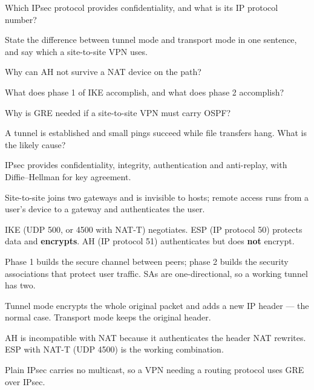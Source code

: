 \begin{checkpoint}
\begin{tightnum}
  \item Which IPsec protocol provides confidentiality, and what is its IP
        protocol number?
  \item State the difference between tunnel mode and transport mode in one
        sentence, and say which a site-to-site VPN uses.
  \item Why can AH not survive a NAT device on the path?
  \item What does phase 1 of IKE accomplish, and what does phase 2 accomplish?
  \item Why is GRE needed if a site-to-site VPN must carry OSPF?
  \item A tunnel is established and small pings succeed while file transfers
        hang. What is the likely cause?
\end{tightnum}
\end{checkpoint}

\begin{chaptersummary}
\begin{tight}
  \item IPsec provides confidentiality, integrity, authentication and
        anti-replay, with Diffie--Hellman for key agreement.
  \item Site-to-site joins two gateways and is invisible to hosts; remote access
        runs from a user's device to a gateway and authenticates the user.
  \item IKE (UDP 500, or 4500 with NAT-T) negotiates. ESP (IP protocol 50)
        protects data and \textbf{encrypts}. AH (IP protocol 51) authenticates
        but does \textbf{not} encrypt.
  \item Phase 1 builds the secure channel between peers; phase 2 builds the
        security associations that protect user traffic. SAs are
        one-directional, so a working tunnel has two.
  \item Tunnel mode encrypts the whole original packet and adds a new IP header
        --- the normal case. Transport mode keeps the original header.
  \item AH is incompatible with NAT because it authenticates the header NAT
        rewrites. ESP with NAT-T (UDP 4500) is the working combination.
  \item Plain IPsec carries no multicast, so a VPN needing a routing protocol
        uses GRE over IPsec.
\end{tight}
\end{chaptersummary}

